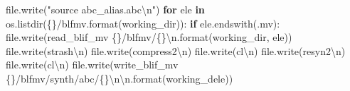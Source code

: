 \documentclass[
]{book}
\newenvironment{Shaded}{\begin{snugshade}}{\end{snugshade}}
\newcommand{\BuiltInTok}[1]{#1}
\newcommand{\CharTok}[1]{\textcolor[rgb]{0.31,0.60,0.02}{#1}}
\newcommand{\ControlFlowTok}[1]{\textcolor[rgb]{0.13,0.29,0.53}{\textbf{#1}}}
\newcommand{\KeywordTok}[1]{\textcolor[rgb]{0.13,0.29,0.53}{\textbf{#1}}}
\newcommand{\NormalTok}[1]{#1}
\newcommand{\SpecialCharTok}[1]{\textcolor[rgb]{0.00,0.00,0.00}{#1}}
\newcommand{\StringTok}[1]{\textcolor[rgb]{0.31,0.60,0.02}{#1}}
\begin{document}
\begin{Shaded}
\begin{Highlighting}[]
    \BuiltInTok{file}\NormalTok{.write(}\StringTok{"source abc\_alias.abc}\CharTok{\textbackslash{}n}\StringTok{"}\NormalTok{)}
    \ControlFlowTok{for}\NormalTok{ ele }\KeywordTok{in}\NormalTok{ os.listdir(}\StringTok{\textquotesingle{}}\SpecialCharTok{\{\}}\StringTok{/blfmv\textquotesingle{}}\NormalTok{.}\BuiltInTok{format}\NormalTok{(working\_dir)):}
      \ControlFlowTok{if}\NormalTok{ ele.endswith(}\StringTok{\textquotesingle{}.mv\textquotesingle{}}\NormalTok{):}
        \BuiltInTok{file}\NormalTok{.write(}\StringTok{\textquotesingle{}read\_blif\_mv }\SpecialCharTok{\{\}}\StringTok{/blfmv/}\SpecialCharTok{\{\}}\CharTok{\textbackslash{}n}\StringTok{\textquotesingle{}}\NormalTok{.}\BuiltInTok{format}\NormalTok{(working\_dir, ele))}
        \BuiltInTok{file}\NormalTok{.write(}\StringTok{\textquotesingle{}strash}\CharTok{\textbackslash{}n}\StringTok{\textquotesingle{}}\NormalTok{)}
        \BuiltInTok{file}\NormalTok{.write(}\StringTok{\textquotesingle{}compress2}\CharTok{\textbackslash{}n}\StringTok{\textquotesingle{}}\NormalTok{)}
        \BuiltInTok{file}\NormalTok{.write(}\StringTok{\textquotesingle{}cl}\CharTok{\textbackslash{}n}\StringTok{\textquotesingle{}}\NormalTok{)}
        \BuiltInTok{file}\NormalTok{.write(}\StringTok{\textquotesingle{}resyn2}\CharTok{\textbackslash{}n}\StringTok{\textquotesingle{}}\NormalTok{)}
        \BuiltInTok{file}\NormalTok{.write(}\StringTok{\textquotesingle{}cl}\CharTok{\textbackslash{}n}\StringTok{\textquotesingle{}}\NormalTok{)}
        \BuiltInTok{file}\NormalTok{.write(}\StringTok{\textquotesingle{}write\_blif\_mv }\SpecialCharTok{\{\}}\StringTok{/blfmv/synth/abc/}\SpecialCharTok{\{\}}\CharTok{\textbackslash{}n\textbackslash{}n}\StringTok{\textquotesingle{}}\NormalTok{.}\BuiltInTok{format}\NormalTok{(working\_dele))}
  

\end{Highlighting}
\end{Shaded}
\end{document}
